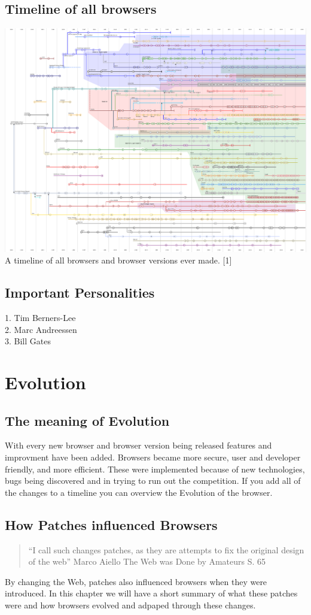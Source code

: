\documentclass[runningheads]{llncs}
\begin{document}
		\subsection{Timeline of all browsers}		\includegraphics{TimelineOfWebBrowsers.png} 
		A timeline of all browsers and browser versions ever made. [1]
		\subsection{Important Personalities}
		1. Tim Berners-Lee\\
		2. Marc Andreessen\\
		3. Bill Gates\\
	\section{Evolution}
		\subsection{The meaning of Evolution}
		With every new browser and browser version being released features and improvment have been added. Browsers became more secure, user and developer friendly, and more efficient. These were implemented because of new technologies, bugs being discovered and in trying to run out the competition. If you add all of the changes to a timeline you can overview the Evolution of the browser.
		\subsection{How Patches influenced Browsers}
			\begin{quote}``I call such changes patches, as they are attempts to fix the original design of the web'' Marco Aiello The Web was Done by Amateurs S. 65 \end{quote}
		By changing the Web, patches also influenced browsers when they were introduced. In this chapter we will have a short summary of what these patches were and how browsers evolved and adpaped through these changes.
\end{document}
